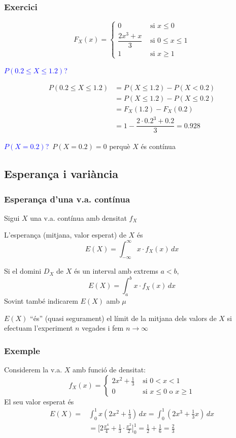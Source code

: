 \documentclass[12pt,t]{beamer}\usepackage[]{graphicx}\usepackage[]{color}
\newcommand{\blue}[1]{\textcolor{blue}{#1}}
\renewcommand{\emph}[1]{{\color{red}#1}}
\renewcommand{\leq}{\leqslant}
\renewcommand{\geq}{\geqslant}
\theoremstyle{plain}
\theoremstyle{definition}
\begin{document}
\begin{frame}
\frametitle{Exercici}
\vspace*{-1cm}

$$
F_X(x)=\left\{\begin{array}{lll}
0 & \mbox{ si $x\leq 0$}\\
\dfrac{2x^3+x}{3} & \mbox{ si } 0\leq x\leq 1\\
1 & \mbox{ si $x\geq 1$}
\end{array}\right.
$$
\medskip

\blue{$P(0.2\leq X\leq 1.2)$?}\pause
\smallskip

$$
\begin{array}{rl}
P(0.2\leq X\leq 1.2) & =P(X\leq 1.2)-P(X<0.2)\\ & =P(X\leq 1.2)-P(X\leq 0.2)\\ & =F_X(1.2)-F_X(0.2)\\[1ex] & =
1-\dfrac{2\cdot 0.2^3+0.2}{3}=0.928
\end{array}
$$
\pause\medskip

\blue{$P(X=0.2)$?}\pause\ $P(X=0.2)=0$ perquè $X$ és contínua



\end{frame}


\subsection{Esperança i variància}

\begin{frame}
\frametitle{Esperança d'una v.a. contínua}
Sigui $X$ una v.a. contínua amb densitat $f_X$
\medskip

L'\emph{esperança} (\emph{mitjana}, \emph{valor esperat})  de  $X$ és 
$$
E(X)=\int_{-\infty}^{\infty}x \cdot f_{X}(x)\, dx
$$

Si el  domini $D_X$ de $X$ és  un interval amb extrems $a<b$,
$$
E(X)=\int_{a}^{b}x \cdot f_{X}(x)\, dx
$$ 
Sovint també indicarem $E(X)$ amb $\mu$
\medskip

$E(X)$ ``és'' (quasi segurament) el límit de la mitjana dels valors de $X$ si efectuam l'experiment  $n$ vegades i fem $n\to \infty$
\end{frame}

\begin{frame}
\frametitle{Exemple}
Considerem  la v.a. $X$  amb funció de densitat:
$$
f_X(x)=\left\{\begin{array}{ll} 2 x^2+\frac{1}{3} &\mbox{ si $0 <x<1$} \\
0 & \mbox{ si $x\leq 0$ o $x\geq 1$} 
 \end{array}\right.
$$
El seu valor esperat és
$$
\begin{array}{rl}
E(X)= & \displaystyle \int_{0}^1 x \left(2 x^2 +\frac{1}{3}\right)\, dx= \int_{0}^1 \left(2 x^3
+\frac{1}{3}x\right)\, dx\\[3ex] & = \displaystyle
\Big[2 \frac{x^4}{4}+\frac{1}{3} \cdot \frac{x^2}{2}\Big]_{0}^{1}=
 \frac{1}{2}+\frac{1}{6} =\frac{2}{3}
\end{array}
$$

\end{frame}
\end{document}
